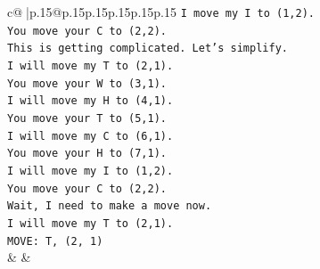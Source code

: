 \documentclass{article}
\begin{document}
{\begin{supertabular}{c@{$\;$}|p{.15\linewidth}@{}p{.15\linewidth}p{.15\linewidth}p{.15\linewidth}p{.15\linewidth}p{.15\linewidth}}
{{{\texttt{I move my I to (1,2).} \\
\texttt{You move your C to (2,2).} \\
\texttt{This is getting complicated. Let's simplify.} \\
\texttt{I will move my T to (2,1).} \\
\texttt{You move your W to (3,1).} \\
\texttt{I will move my H to (4,1).} \\
\texttt{You move your T to (5,1).} \\
\texttt{I will move my C to (6,1).} \\
\texttt{You move your H to (7,1).} \\
\texttt{I will move my I to (1,2).} \\
\texttt{You move your C to (2,2).} \\
\texttt{Wait, I need to make a move now.} \\
\texttt{I will move my T to (2,1).} \\
\texttt{MOVE: T, (2, 1)} \\
            }
        }
    }
    & & \\ \\


\end{supertabular}}
\end{document}
